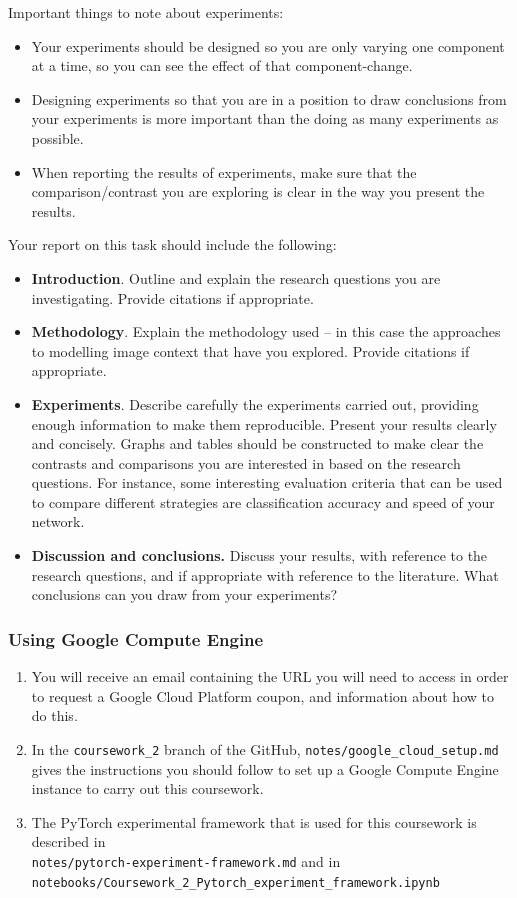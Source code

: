 \documentclass[11pt,]{article}
\begin{document}
Important things to note about experiments:
\begin{itemize}
    \item Your experiments should be designed so you are only varying one component at a time, so you can see the effect of that component-change.
    \item Designing experiments so that you are in a position to draw conclusions from your experiments is more important than the doing as many experiments as possible.
    \item When reporting the results of experiments, make sure that the comparison/contrast you are exploring is clear in the way you present the results.
\end{itemize}

Your report on this task should include the following:
\begin{itemize}
    \item \textbf{Introduction}.  Outline and explain the research questions you are investigating.  Provide citations if appropriate.
    \item \textbf{Methodology}.  Explain the methodology used -- in this case the approaches to modelling image context that have you explored.   Provide citations if appropriate.
    \item \textbf{Experiments}.  Describe carefully the experiments carried out, providing enough information to make them reproducible.  Present your results clearly and concisely.  Graphs and tables should be constructed to make clear the contrasts and comparisons you are interested in based on the research questions. For instance, some interesting evaluation criteria that can be used to compare different strategies are classification accuracy and speed of your network.
    \item \textbf{Discussion and conclusions.}  Discuss your results, with reference to the research questions, and if appropriate with reference to the literature.  What conclusions can you draw from your experiments?
\end{itemize}


\subsubsection*{Using Google Compute Engine}
\begin{enumerate}
    \item You will receive an email containing the URL you will need to access in order to request a Google Cloud Platform coupon, and information about how to do this.
    \item In the \texttt{coursework\_2} branch of the GitHub, \texttt{notes/google\_cloud\_setup.md} gives the instructions you should follow to set up a Google Compute Engine instance to carry out this coursework.
    \item The PyTorch experimental framework that is used for this coursework is described in\\\texttt{notes/pytorch-experiment-framework.md} and in\\\texttt{notebooks/Coursework\_2\_Pytorch\_experiment\_framework.ipynb}
\end{enumerate}
\end{document}
